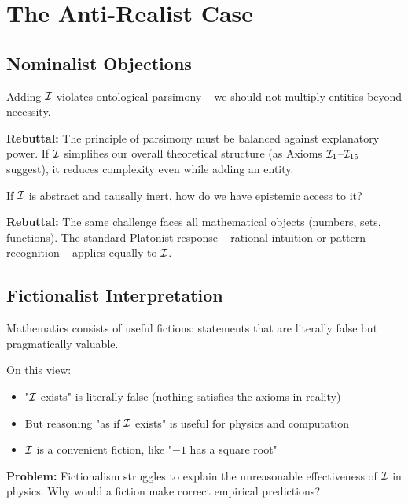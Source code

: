 \section{The Anti-Realist Case}

\subsection{Nominalist Objections}

\begin{objection}
Adding $\mathcal{I}$ violates ontological parsimony -- we should not multiply entities beyond necessity.
\end{objection}

\textbf{Rebuttal:} The principle of parsimony must be balanced against explanatory power. If $\mathcal{I}$ simplifies our overall theoretical structure (as Axioms $\mathcal{I}_1$--$\mathcal{I}_{15}$ suggest), it reduces complexity even while adding an entity.

\begin{objection}
If $\mathcal{I}$ is abstract and causally inert, how do we have epistemic access to it?
\end{objection}

\textbf{Rebuttal:} The same challenge faces all mathematical objects (numbers, sets, functions). The standard Platonist response -- rational intuition or pattern recognition -- applies equally to $\mathcal{I}$.

\subsection{Fictionalist Interpretation}

\begin{definition}
Mathematics consists of useful fictions: statements that are literally false but pragmatically valuable.
\end{definition}

On this view:
\begin{itemize}
    \item "$\mathcal{I}$ exists" is literally false (nothing satisfies the axioms in reality)
    \item But reasoning "as if $\mathcal{I}$ exists" is useful for physics and computation
    \item $\mathcal{I}$ is a convenient fiction, like "$-1$ has a square root"
\end{itemize}

\textbf{Problem:} Fictionalism struggles to explain the unreasonable effectiveness of $\mathcal{I}$ in physics. Why would a fiction make correct empirical predictions?

